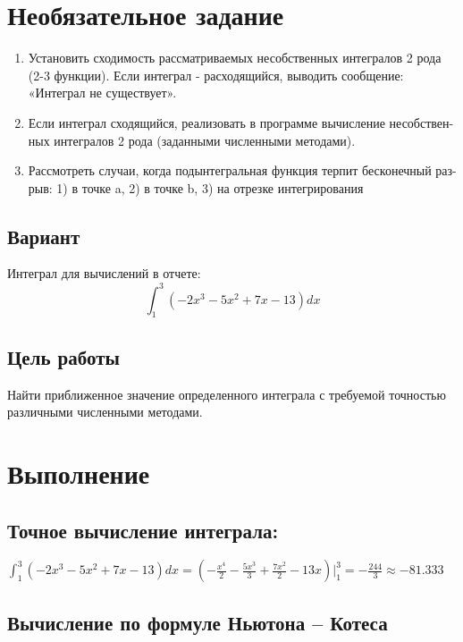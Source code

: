 \documentclass{article}
\begin{document}
\section{Необязательное задание}
\begin{enumerate}
	\item Установить сходимость рассматриваемых несобственных интегралов 2 рода
	(2-3 функции). Если интеграл - расходящийся, выводить сообщение: «Интеграл
	не существует».
	
	\item Если интеграл сходящийся, реализовать в программе вычисление несобствен-
	ных интегралов 2 рода (заданными численными методами).
	
	\item Рассмотреть случаи, когда подынтегральная функция терпит бесконечный раз-
	рыв: 1) в точке a, 2) в точке b, 3) на отрезке интегрирования
\end{enumerate}

\subsection{Вариант}

Интеграл для вычислений в отчете: 
 $$\int_{1}^{3}(-2x^3-5x^2+7x-13)dx$$

\subsection{Цель работы}
      Найти приближенное значение определенного интеграла с требуемой точностью различными численными методами.

\section{Выполнение}

     \subsection{Точное вычисление интеграла:}
     
     $\displaystyle \int_{1}^{3}(-2x^3-5x^2+7x-13)dx 
      = \left(- \frac{x^4}{2} - \frac{5x^3}{3} + \frac{7x^2}{2}-13x\right)\biggr|_1^3
      = - \frac{244}{3} \approx -81.333$
      
    
     \subsection{Вычисление по формуле Ньютона – Котеса}
     
\end{document}
